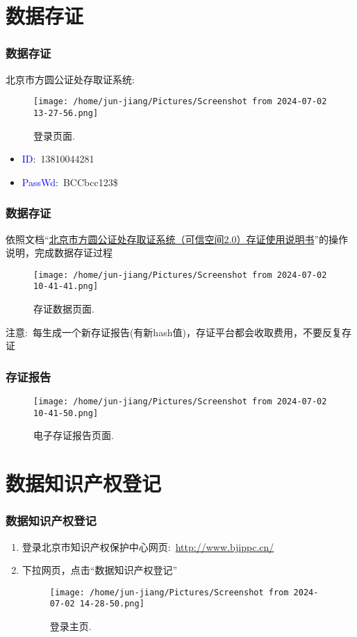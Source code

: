 \small
\section{数据存证}
\frame
{
	\frametitle{数据存证}
	北京市方圆公证处存取证系统:\\
\begin{figure}[h!]
\centering
\texttt{[image: /home/jun-jiang/Pictures/Screenshot from 2024-07-02 13-27-56.png]}
\caption{\tiny 登录页面.}%
\label{Evindence_Login}
\end{figure}
\vskip -0.15in
	\begin{itemize}
		\item \textrm{\textcolor{blue}{ID}:~13810044281}
		\item \textrm{\textcolor{blue}{PassWd}:~BCCbcc123\$}
	\end{itemize}
}

\frame
{
	\frametitle{数据存证}
	依照文档``\href{run:./北京市方圆公证处存取证系统（可信空间2.0）存证使用说明书.pdf}{北京市方圆公证处存取证系统（可信空间2.0）存证使用说明书}''的操作说明，完成数据存证过程
\begin{figure}[h!]
\vskip -0.05in
\centering
\texttt{[image: /home/jun-jiang/Pictures/Screenshot from 2024-07-02 10-41-41.png]}
\caption{\tiny 存证数据页面.}%
\label{Evindence_Data}
\end{figure}
\textcolor{red!80}{注意}:~每生成一个新存证报告(有新\textrm{hash}值)，存证平台都会收取费用，不要反复存证
}

\frame
{
	\frametitle{存证报告}
\begin{figure}[h!]
\vskip -0.05in
\centering
\texttt{[image: /home/jun-jiang/Pictures/Screenshot from 2024-07-02 10-41-50.png]}
\caption{\tiny 电子存证报告页面.}%
\label{Evindence_Report}
\end{figure}
}

\section{数据知识产权登记}
\frame
{
	\frametitle{数据知识产权登记}
	\begin{enumerate}
		\item 登录北京市知识产权保护中心网页:~\url{http://www.bjippc.cn/}
		\item 下拉网页，点击``\textcolor{blue!70}{数据知识产权登记}''
\begin{figure}[h!]
\centering
\texttt{[image: /home/jun-jiang/Pictures/Screenshot from 2024-07-02 14-28-50.png]}
\caption{\tiny 登录主页.}%
\label{Data-Properties_Main}
\end{figure}
	\end{enumerate}
}

